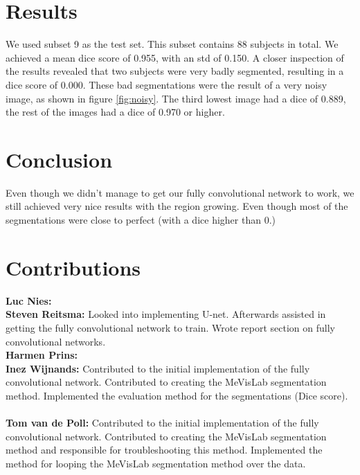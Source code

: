 \documentclass[a4paper,10pt]{article}
\numberwithin{equation}{section} %
\numberwithin{figure}{section} %
\numberwithin{table}{section} %
\begin{document}
\section{Results}
\label{sec:results}
We used subset 9 as the test set. This subset contains 88 subjects in total. We achieved a mean dice score of 0.955, with an std of 0.150. A closer inspection of the results revealed that two subjects were very badly segmented, resulting in a dice score of 0.000. These bad segmentations were the result of a very noisy image, as shown in figure \ref{fig:noisy}. The third lowest image had a dice of 0.889, the rest of the images had a dice of 0.970 or higher. 

\section{Conclusion}
Even though we didn't manage to get our fully convolutional network to work, we still achieved very nice results with the region growing. Even though most of the segmentations were close to perfect (with a dice higher than 0.)

\appendix
\section{Contributions}

\textbf{Luc Nies:}
\\
\textbf{Steven Reitsma:} Looked into implementing U-net. Afterwards assisted in getting the fully convolutional network to train. Wrote report section on fully convolutional networks.
\\
\textbf{Harmen Prins:}
\\
\textbf{Inez Wijnands:} Contributed to the initial implementation of the fully convolutional network. Contributed to creating the MeVisLab segmentation method. Implemented the evaluation method for the segmentations (Dice score).\\
\\
\textbf{Tom van de Poll:} Contributed to the initial implementation of the fully convolutional network. Contributed to creating the MeVisLab segmentation method and responsible for troubleshooting this method. Implemented the method for looping the MeVisLab segmentation method over the data.
\end{document}
